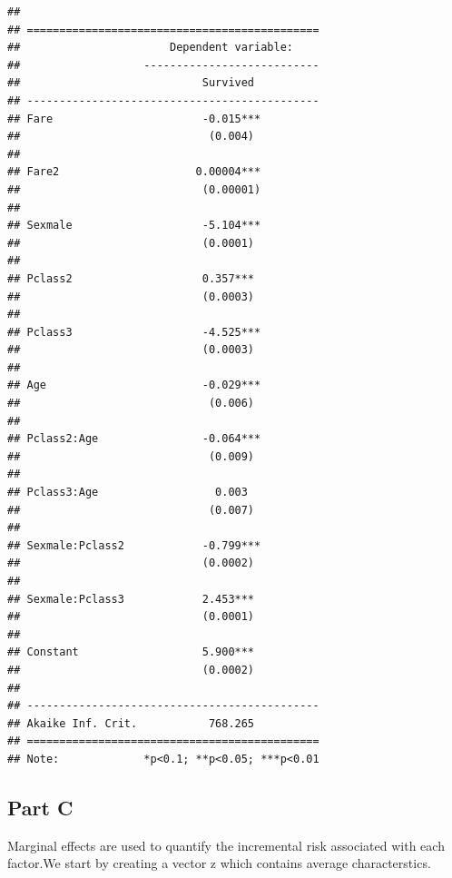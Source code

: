 \documentclass[
]{article}
\begin{document}
\begin{verbatim}
## 
## =============================================
##                       Dependent variable:    
##                   ---------------------------
##                            Survived          
## ---------------------------------------------
## Fare                       -0.015***         
##                             (0.004)          
##                                              
## Fare2                     0.00004***         
##                            (0.00001)         
##                                              
## Sexmale                    -5.104***         
##                            (0.0001)          
##                                              
## Pclass2                    0.357***          
##                            (0.0003)          
##                                              
## Pclass3                    -4.525***         
##                            (0.0003)          
##                                              
## Age                        -0.029***         
##                             (0.006)          
##                                              
## Pclass2:Age                -0.064***         
##                             (0.009)          
##                                              
## Pclass3:Age                  0.003           
##                             (0.007)          
##                                              
## Sexmale:Pclass2            -0.799***         
##                            (0.0002)          
##                                              
## Sexmale:Pclass3            2.453***          
##                            (0.0001)          
##                                              
## Constant                   5.900***          
##                            (0.0002)          
##                                              
## ---------------------------------------------
## Akaike Inf. Crit.           768.265          
## =============================================
## Note:             *p<0.1; **p<0.05; ***p<0.01
\end{verbatim}

\hypertarget{part-c}{%
\subsection{Part C}\label{part-c}}

Marginal effects are used to quantify the incremental risk associated
with each factor.We start by creating a vector z which contains average
characterstics.
\end{document}
